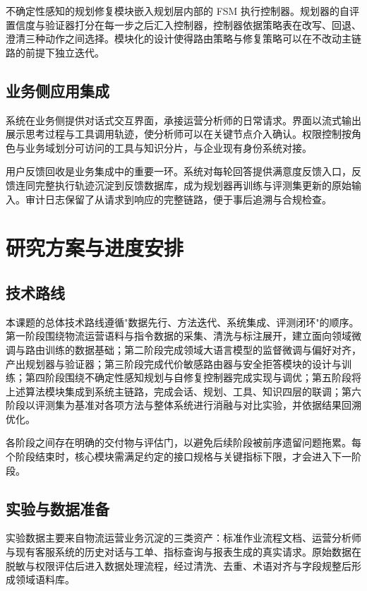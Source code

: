 不确定性感知的规划修复模块嵌入规划层内部的 FSM 执行控制器。规划器的自评置信度与验证器打分在每一步之后汇入控制器，控制器依据策略表在改写、回退、澄清三种动作之间选择。模块化的设计使得路由策略与修复策略可以在不改动主链路的前提下独立迭代。

\section{业务侧应用集成}

系统在业务侧提供对话式交互界面，承接运营分析师的日常请求。界面以流式输出展示思考过程与工具调用轨迹，使分析师可以在关键节点介入确认。权限控制按角色与业务域划分可访问的工具与知识分片，与企业现有身份系统对接。

用户反馈回收是业务集成中的重要一环。系统对每轮回答提供满意度反馈入口，反馈连同完整执行轨迹沉淀到反馈数据库，成为规划器再训练与评测集更新的原始输入。审计日志保留了从请求到响应的完整链路，便于事后追溯与合规检查。


\chapter{研究方案与进度安排}

\section{技术路线}

本课题的总体技术路线遵循"数据先行、方法迭代、系统集成、评测闭环"的顺序。第一阶段围绕物流运营语料与指令数据的采集、清洗与标注展开，建立面向领域微调与路由训练的数据基础；第二阶段完成领域大语言模型的监督微调与偏好对齐，产出规划器与验证器；第三阶段完成代价敏感路由器与安全拒答模块的设计与训练；第四阶段围绕不确定性感知规划与自修复控制器完成实现与调优；第五阶段将上述算法模块集成到系统主链路，完成会话、规划、工具、知识四层的联调；第六阶段以评测集为基准对各项方法与整体系统进行消融与对比实验，并依据结果回溯优化。

各阶段之间存在明确的交付物与评估门，以避免后续阶段被前序遗留问题拖累。每个阶段结束时，核心模块需满足约定的接口规格与关键指标下限，才会进入下一阶段。

\section{实验与数据准备}

实验数据主要来自物流运营业务沉淀的三类资产：标准作业流程文档、运营分析师与现有客服系统的历史对话与工单、指标查询与报表生成的真实请求。原始数据在脱敏与权限评估后进入数据处理流程，经过清洗、去重、术语对齐与字段规整后形成领域语料库。


